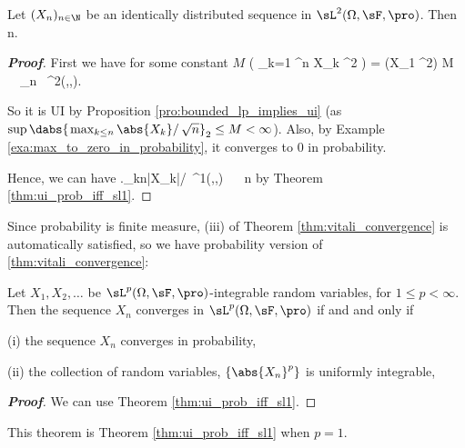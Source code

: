 \begin{proposition}
Let $(X_n)_{n\in\N}$ be an identically distributed sequence in $\sL^2(\Omega,\sF,\pro)$. Then
\be
\E{} n\to \infty.
\ee
\end{proposition}

\begin{proof}[\bf Proof]
First we have for some constant $M$
\be
\E{} \leq  {}  \left( \sum_{k=1} ^n X_k ^2 \right) =  (X_1 ^2) \leq M \ \ra \ _n \ \sL^2(\Omega,\sF,\pro).
\ee

So it is UI by Proposition \ref{pro:bounded_lp_implies_ui} (as $\sup\dabs{\left.\max_{k\leq n}\abs{X_k}\right/\sqrt{n}}_2 \leq M < \infty$). Also, by Example \ref{exa:max_to_zero_in_probability}, it converges to 0 in probability.

Hence, we can have
\be
\left.\max_{k\leq n}|X_k|\right/\  \sL^1(\Omega,\sF,\pro) \ \ra \ \E{} n\to \infty
\ee
by Theorem \ref{thm:ui_prob_iff_sl1}.
\end{proof}


Since probability is finite measure, (iii) of Theorem \ref{thm:vitali_convergence} is automatically satisfied, so we have probability version of \ref{thm:vitali_convergence}:

\begin{theorem}\label{thm:slp_iff_probability_ui}
Let $X_1, X_2, \dots$ be $\sL^p(\Omega,\sF,\pro)$-integrable random variables, for $1\leq p<\infty$. Then the sequence $X_n$ converges in $\sL^p(\Omega,\sF,\pro)$ if and and only if
\ben
\item [(i)] the sequence $X_n$ converges in probability,
\item [(ii)] the collection of random variables, $\{\abs{X_n}^p\}$ is uniformly integrable,
\een
\end{theorem}

\begin{proof}[\bf Proof]
We can use Theorem \ref{thm:ui_prob_iff_sl1}. %
\end{proof}

\begin{remark}
This theorem is Theorem \ref{thm:ui_prob_iff_sl1} when $p=1$. %
\end{remark}


